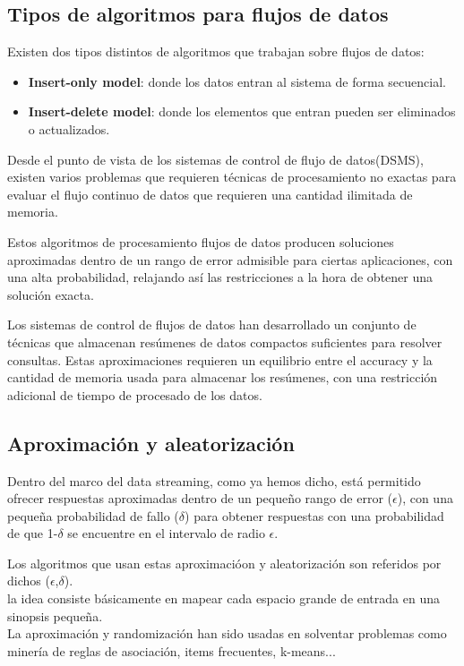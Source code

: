 \subsection{Tipos de algoritmos para flujos de datos}

Existen dos tipos distintos de algoritmos que trabajan sobre flujos de datos:
\begin{itemize}
	\item \textbf{Insert-only model}: donde los datos entran al sistema de forma secuencial.
	\item \textbf{Insert-delete model}: donde los elementos que entran pueden ser eliminados o actualizados.
\end{itemize}

Desde el punto de vista de los sistemas de control de flujo de datos(DSMS), existen varios problemas que requieren técnicas de procesamiento no exactas para evaluar el flujo continuo de datos que requieren una cantidad ilimitada de memoria.

Estos algoritmos de procesamiento flujos de datos producen soluciones aproximadas dentro de un rango de error admisible para ciertas aplicaciones, con una alta probabilidad, relajando así las restricciones a la hora de obtener una solución exacta.

Los sistemas de control de flujos de datos han desarrollado un conjunto
de técnicas que almacenan resúmenes de datos compactos suficientes para resolver consultas. Estas aproximaciones requieren un equilibrio entre el accuracy y la cantidad de memoria usada para almacenar los resúmenes, con una restricción adicional de tiempo de procesado de los datos.


\subsection{Aproximación y aleatorización}

Dentro del marco del data streaming, como ya hemos dicho, está permitido ofrecer respuestas aproximadas dentro de un pequeño rango de error ($\epsilon$), con una pequeña probabilidad de fallo ($\delta$) para obtener respuestas con una probabilidad de que 1-$\delta$ se encuentre en el intervalo de radio $\epsilon$.

Los algoritmos que usan estas aproximacióon y aleatorización son referidos por dichos ($\epsilon$,$\delta$).\\
la idea consiste básicamente en mapear cada espacio grande de entrada en una sinopsis pequeña.\\
La aproximación y randomización han sido usadas en solventar problemas como minería de reglas de asociación, items frecuentes, k-means...


